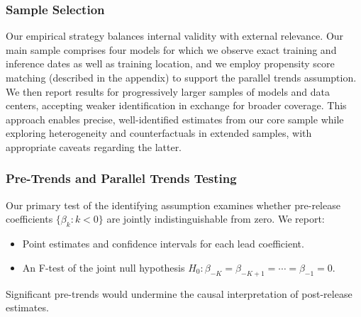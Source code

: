 \documentclass[sigconf]{acmart}
\begin{document}
\subsubsection{Sample Selection}

Our empirical strategy balances internal validity with external relevance. Our main sample comprises four models for which we observe exact training and inference dates as well as training location, and we employ propensity score matching (described in the appendix) to support the parallel trends assumption. We then report results for progressively larger samples of models and data centers, accepting weaker identification in exchange for broader coverage. This approach enables precise, well-identified estimates from our core sample while exploring heterogeneity and counterfactuals in extended samples, with appropriate caveats regarding the latter.


\subsubsection{Pre-Trends and Parallel Trends Testing}

Our primary test of the identifying assumption examines whether pre-release coefficients $\{\beta_k : k < 0\}$ are jointly indistinguishable from zero. We report:
\begin{itemize}
    \item Point estimates and confidence intervals for each lead coefficient.
    \item An F-test of the joint null hypothesis $H_0: \beta_{-K} = \beta_{-K+1} = \cdots = \beta_{-1} = 0$.
\end{itemize}
Significant pre-trends would undermine the causal interpretation of post-release estimates.
\end{document}

